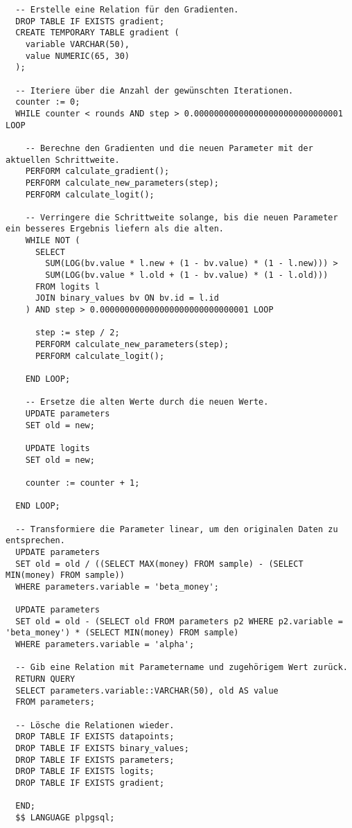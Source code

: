 \begin{verbatim}
  -- Erstelle eine Relation für den Gradienten.
  DROP TABLE IF EXISTS gradient;
  CREATE TEMPORARY TABLE gradient (
    variable VARCHAR(50),
    value NUMERIC(65, 30)
  );

  -- Iteriere über die Anzahl der gewünschten Iterationen.
  counter := 0;
  WHILE counter < rounds AND step > 0.000000000000000000000000000001 LOOP

    -- Berechne den Gradienten und die neuen Parameter mit der aktuellen Schrittweite.
    PERFORM calculate_gradient();
    PERFORM calculate_new_parameters(step);
    PERFORM calculate_logit();

    -- Verringere die Schrittweite solange, bis die neuen Parameter ein besseres Ergebnis liefern als die alten.
    WHILE NOT (
      SELECT
        SUM(LOG(bv.value * l.new + (1 - bv.value) * (1 - l.new))) >
        SUM(LOG(bv.value * l.old + (1 - bv.value) * (1 - l.old)))
      FROM logits l
      JOIN binary_values bv ON bv.id = l.id
    ) AND step > 0.000000000000000000000000000001 LOOP

      step := step / 2;
      PERFORM calculate_new_parameters(step);
      PERFORM calculate_logit();

    END LOOP;

    -- Ersetze die alten Werte durch die neuen Werte.
    UPDATE parameters
    SET old = new;

    UPDATE logits
    SET old = new;

    counter := counter + 1;

  END LOOP;

  -- Transformiere die Parameter linear, um den originalen Daten zu entsprechen.
  UPDATE parameters
  SET old = old / ((SELECT MAX(money) FROM sample) - (SELECT MIN(money) FROM sample))
  WHERE parameters.variable = 'beta_money';

  UPDATE parameters
  SET old = old - (SELECT old FROM parameters p2 WHERE p2.variable = 'beta_money') * (SELECT MIN(money) FROM sample)
  WHERE parameters.variable = 'alpha';

  -- Gib eine Relation mit Parametername und zugehörigem Wert zurück.
  RETURN QUERY
  SELECT parameters.variable::VARCHAR(50), old AS value
  FROM parameters;

  -- Lösche die Relationen wieder.
  DROP TABLE IF EXISTS datapoints;
  DROP TABLE IF EXISTS binary_values;
  DROP TABLE IF EXISTS parameters;
  DROP TABLE IF EXISTS logits;
  DROP TABLE IF EXISTS gradient;

  END;
  $$ LANGUAGE plpgsql;
\end{verbatim}

